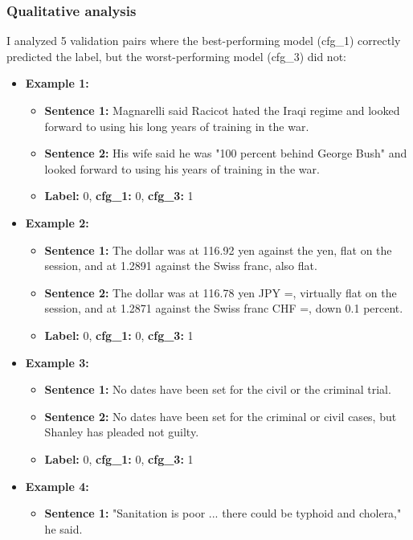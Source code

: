 \documentclass[12pt]{article}
\begin{document}
\subsubsection*{Qualitative analysis}
I analyzed 5 validation pairs where the best-performing model (cfg\_1) correctly predicted the label, but the worst-performing model (cfg\_3) did not:

\begin{itemize}
    \item \textbf{Example 1:}
    \begin{itemize}
        \item \textbf{Sentence 1:} Magnarelli said Racicot hated the Iraqi regime and looked forward to using his long years of training in the war.
        \item \textbf{Sentence 2:} His wife said he was "100 percent behind George Bush" and looked forward to using his years of training in the war.
        \item \textbf{Label:} 0, \textbf{cfg\_1:} 0, \textbf{cfg\_3:} 1
    \end{itemize}
    \item \textbf{Example 2:}
    \begin{itemize}
        \item \textbf{Sentence 1:} The dollar was at 116.92 yen against the yen, flat on the session, and at 1.2891 against the Swiss franc, also flat.
        \item \textbf{Sentence 2:} The dollar was at 116.78 yen JPY =, virtually flat on the session, and at 1.2871 against the Swiss franc CHF =, down 0.1 percent.
        \item \textbf{Label:} 0, \textbf{cfg\_1:} 0, \textbf{cfg\_3:} 1
    \end{itemize}
    \item \textbf{Example 3:}
    \begin{itemize}
        \item \textbf{Sentence 1:} No dates have been set for the civil or the criminal trial.
        \item \textbf{Sentence 2:} No dates have been set for the criminal or civil cases, but Shanley has pleaded not guilty.
        \item \textbf{Label:} 0, \textbf{cfg\_1:} 0, \textbf{cfg\_3:} 1
    \end{itemize}
    \item \textbf{Example 4:}
    \begin{itemize}
        \item \textbf{Sentence 1:} "Sanitation is poor ... there could be typhoid and cholera," he said.

\end{itemize}
\end{itemize}
\end{document}

